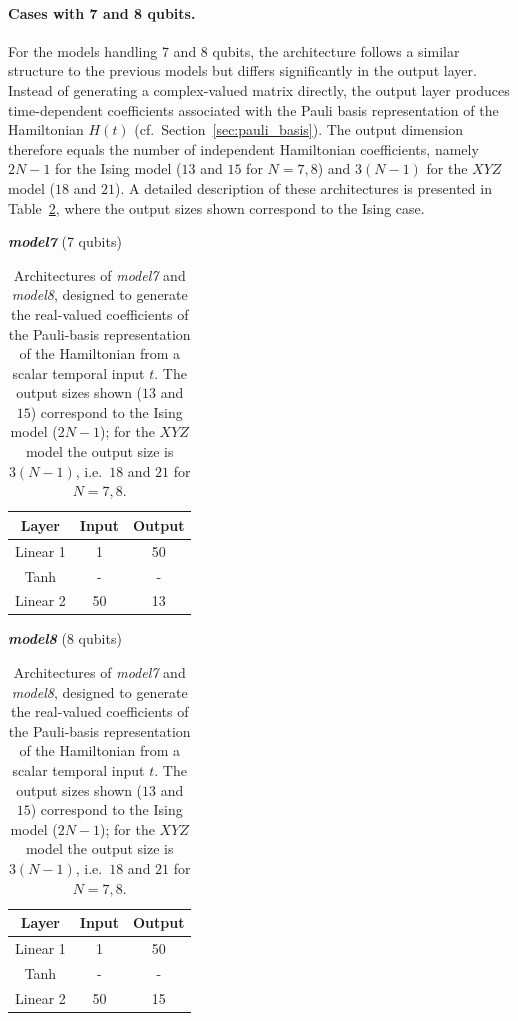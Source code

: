 \paragraph{Cases with 7 and 8 qubits.}
For the models handling 7 and 8 qubits, the architecture follows a similar structure to the previous models but differs significantly in the output layer. Instead of generating a complex-valued matrix directly, the output layer produces time-dependent coefficients associated with the Pauli basis representation of the Hamiltonian $H(t)$ (cf.~Section~\ref{sec:pauli_basis}). The output dimension therefore equals the number of independent Hamiltonian coefficients, namely $2N-1$ for the Ising model ($13$ and $15$ for $N=7,8$) and $3(N-1)$ for the $XYZ$ model ($18$ and $21$). A detailed description of these architectures is presented in Table~\ref{tab:res-model-architecture2}, where the output sizes shown correspond to the Ising case.

\begin{table}[htbp]
\centering
\renewcommand{\arraystretch}{1.2}

\begin{minipage}[t]{0.48\textwidth}
\centering
\textbf{\textit{model7}} (7 qubits)\\[0.5ex]
\begin{tabular}{c|c|c}
\hline
\textbf{Layer} & \textbf{Input} & \textbf{Output} \\
\hline \hline
Linear 1 & 1 & 50 \\
Tanh & - & - \\
Linear 2 & 50 & 13 \\
\hline
\end{tabular}
\end{minipage}
\hfill
\begin{minipage}[t]{0.48\textwidth}
\centering
\textbf{\textit{model8}} (8 qubits)\\[0.5ex]
\begin{tabular}{c|c|c}
\hline
\textbf{Layer} & \textbf{Input} & \textbf{Output} \\
\hline \hline
Linear 1 & 1 & 50 \\
Tanh & - & - \\
Linear 2 & 50 & 15 \\
\hline
\end{tabular}
\end{minipage}

\caption[Architectures of \textit{model7} and \textit{model8}]{Architectures of \textit{model7} and \textit{model8}, designed to generate the real-valued coefficients of the Pauli-basis representation of the Hamiltonian from a scalar temporal input $t$. The output sizes shown ($13$ and $15$) correspond to the Ising model ($2N-1$); for the $XYZ$ model the output size is $3(N-1)$, i.e.\ $18$ and $21$ for $N=7,8$.}
\label{tab:res-model-architecture2}
\end{table}

